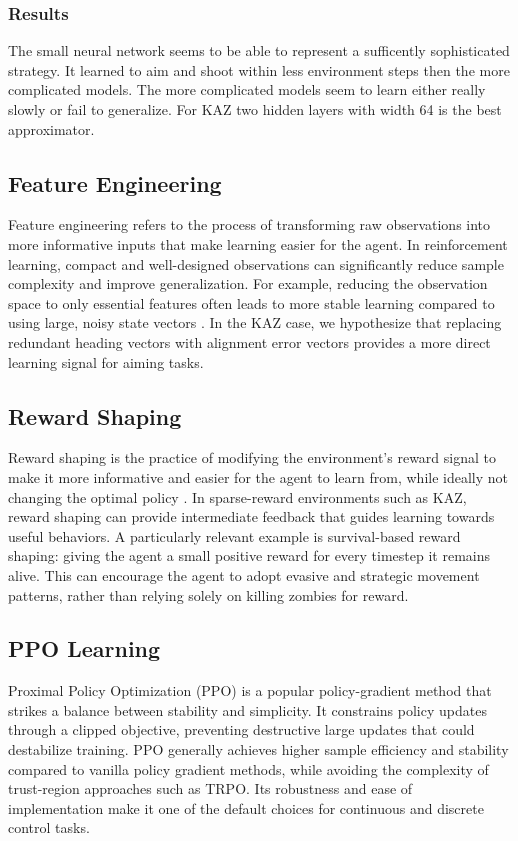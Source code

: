 \subsubsection{Results}
The small neural network seems to be able to represent a sufficently sophisticated strategy. It learned to aim and shoot within less environment steps then the more complicated models. The more complicated models seem to learn either really slowly or fail to generalize. For KAZ two hidden layers with width 64 is the best approximator.

\subsection{Feature Engineering}
Feature engineering refers to the process of transforming raw observations into
more informative inputs that make learning easier for the agent. In reinforcement
learning, compact and well-designed observations can significantly reduce sample
complexity and improve generalization. For example, reducing the observation space
to only essential features often leads to more stable learning compared to using
large, noisy state vectors \cite{rauber2017hindsight}. In the KAZ case, we hypothesize
that replacing redundant heading vectors with alignment error vectors provides a
more direct learning signal for aiming tasks.

\subsection{Reward Shaping}
Reward shaping is the practice of modifying the environment's reward signal to
make it more informative and easier for the agent to learn from, while ideally
not changing the optimal policy \cite{ng1999policy}. In sparse-reward environments
such as KAZ, reward shaping can provide intermediate feedback that guides learning
towards useful behaviors. A particularly relevant example is survival-based reward
shaping: giving the agent a small positive reward for every timestep it remains
alive. This can encourage the agent to adopt evasive and strategic movement
patterns, rather than relying solely on killing zombies for reward.


\subsection{PPO Learning}

Proximal Policy Optimization (PPO) \cite{schulman2017proximal} is a popular
policy-gradient method that strikes a balance between stability and simplicity.
It constrains policy updates through a clipped objective, preventing destructive
large updates that could destabilize training. PPO generally achieves higher
sample efficiency and stability compared to vanilla policy gradient methods,
while avoiding the complexity of trust-region approaches such as TRPO. Its
robustness and ease of implementation make it one of the default choices for
continuous and discrete control tasks.

